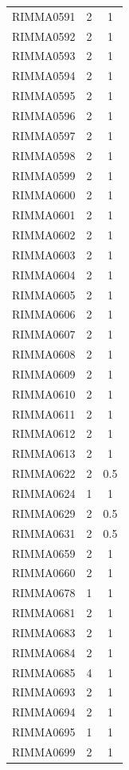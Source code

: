 \documentclass[12pt]{article}
\begin{document}
\begin{table}[htbp]
\begin{tabular}{ccc}
    RIMMA0591 & 2     & 1 \\
    RIMMA0592 & 2     & 1 \\
    RIMMA0593 & 2     & 1 \\
    RIMMA0594 & 2     & 1 \\
    RIMMA0595 & 2     & 1 \\
    RIMMA0596 & 2     & 1 \\
    RIMMA0597 & 2     & 1 \\
    RIMMA0598 & 2     & 1 \\
    RIMMA0599 & 2     & 1 \\
    RIMMA0600 & 2     & 1 \\
    RIMMA0601 & 2     & 1 \\
    RIMMA0602 & 2     & 1 \\
    RIMMA0603 & 2     & 1 \\
    RIMMA0604 & 2     & 1 \\
    RIMMA0605 & 2     & 1 \\
    RIMMA0606 & 2     & 1 \\
    RIMMA0607 & 2     & 1 \\
    RIMMA0608 & 2     & 1 \\
    RIMMA0609 & 2     & 1 \\
    RIMMA0610 & 2     & 1 \\
    RIMMA0611 & 2     & 1 \\
    RIMMA0612 & 2     & 1 \\
    RIMMA0613 & 2     & 1 \\
    RIMMA0622 & 2     & 0.5 \\
    RIMMA0624 & 1     & 1 \\
    RIMMA0629 & 2     & 0.5 \\
    RIMMA0631 & 2     & 0.5 \\
    RIMMA0659 & 2     & 1 \\
    RIMMA0660 & 2     & 1 \\
    RIMMA0678 & 1     & 1 \\
    RIMMA0681 & 2     & 1 \\
    RIMMA0683 & 2     & 1 \\
    RIMMA0684 & 2     & 1 \\
    RIMMA0685 & 4     & 1 \\
    RIMMA0693 & 2     & 1 \\
    RIMMA0694 & 2     & 1 \\
    RIMMA0695 & 1     & 1 \\
    RIMMA0699 & 2     & 1 \\

\end{tabular}
\end{table}
\end{document}
